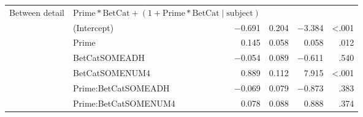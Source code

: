 \documentclass[noamssymb]{beamer}
\begin{document}
\begin{frame}
\begin{adjustbox}{width=1\textwidth,center=\textwidth}
\begin{tabular}{llrrrr}
      Between detail & \multicolumn{2}{l}{\(\text{Prime} * \text{BetCat} + (1 + \text{Prime} * \text{BetCat} \mid \text{subject})\)}  & & & \\
      & (Intercept)  & \(-\)0.691 & 0.204 & \(-\)3.384 & <.001\\
      & Prime & 0.145 & 0.058 & 0.058 & .012 \\
      & BetCatSOMEADH & \(-\)0.054 & 0.089 & \(-\)0.611 & .540 \\
      & BetCatSOMENUM4 & 0.889 & 0.112 & 7.915 & <.001 \\
      & Prime:BetCatSOMEADH & \(-\)0.069 & 0.079 & \(-\)0.873 & .383 \\
      & Prime:BetCatSOMENUM4 & 0.078 & 0.088 & 0.888 & .374 \\
      \hline
    \end{tabular}
  \end{adjustbox}


\end{frame}
\end{document}
